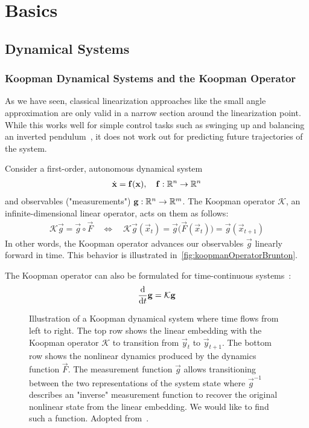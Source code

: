 \section{Basics}



\subsection{Dynamical Systems}
	\subsubsection{Koopman Dynamical Systems and the Koopman Operator}
		As we have seen, classical linearization approaches like the small angle approximation are only valid in a narrow section around the linearization point. While this works well for simple control tasks such as swinging up and balancing an inverted pendulum~\cite{bugejaNonlinearSwingupStabilizing2003}, it does not work out for predicting future trajectories of the system. %

		Consider a first-order, autonomous dynamical system
		\begin{align*}
			\dot{\boldsymbol{\mathrm{x}}} = \boldsymbol{\mathrm{f}}(\boldsymbol{\mathrm{x}}),\quad \boldsymbol{\mathrm{f}} : \mathbb{R}^n \to \mathbb{R}^n
		\end{align*}
		and observables ("measurements") \( \boldsymbol{\mathrm{g}} : \mathbb{R}^n \to \mathbb{R}^m \). The Koopman operator \( \mathcal{K} \), an infinite-dimensional linear operator, acts on them as follows:
		\begin{align*}
			\mathcal{K} \vec{g} = \vec{g} \circ \vec{F} \quad\iff\quad \mathcal{K} \vec{g}(\vec{x}_t) = \vec{g}\big(\vec{F}(\vec{x}_t)\big) = \vec{g}(\vec{x}_{t + 1})
		\end{align*}
		In other words, the Koopman operator advances our observables \(\vec{g}\) linearly forward in time. This behavior is illustrated in~\autoref{fig:koopmanOperatorBrunton}.

		The Koopman operator can also be formulated for time-continuous systems~\cite{abrahamManifoldsTensorAnalysis2012}:
		\begin{align*}
			\dv{t} \boldsymbol{\mathrm{g}} = \mathcal{K} \boldsymbol{\mathrm{g}}
		\end{align*}


		\begin{figure}
			\centering
			\tikzKoopmanOperator
			\caption{Illustration of a Koopman dynamical system where time flows from left to right. The top row shows the linear embedding with the Koopman operator \( \mathcal{K} \) to transition from \(\vec{y}_t\) to \(\vec{y}_{t + 1}\). The bottom row shows the nonlinear dynamics produced by the dynamics function \(\vec{F}\). The measurement function \(\vec{g}\) allows transitioning between the two representations of the system state where \(\vec{g}^{-1}\) describes an "inverse" measurement function to recover the original nonlinear state from the linear embedding. We would like to find such a function. Adopted from~\cite{bruntonKoopmanInvariantSubspaces2016}.}
			\label{fig:koopmanOperatorBrunton}
		\end{figure}

